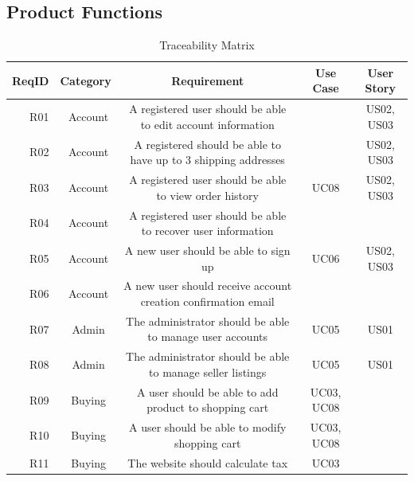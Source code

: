 \documentclass[11pt]{article}
\newcounter{use case ID}
\begin{document}
\subsection{Product Functions}
\begin{table}[H]
        \caption{Traceability Matrix}
        \begin{adjustbox}{width=\columnwidth,center}
            \begin{tabular}{|r | c| c | c| c|}
                \hline
                ReqID & Category & Requirement & Use Case & User Story \\
                \hline
                R01 & \ Account & A \index{registered user}registered user should be able to edit account \index{information}information & & US02, US03 \\
                    \hline
                R02 & \ Account & A registered should be able to have up to 3 shipping addresses &  & US02, US03 \\
                    \hline
                R03 & \ Account & A registered user should be able to view order history & UC08 & US02, US03 \\
                \hline
                R04 & \ Account & A registered user should be able to recover user \index{information}information & &  \\
                \hline
                R05 & \ Account & A new user should be able to sign up & UC06 & US02, US03  \\
                \hline
                R06 & \ Account & A new user should receive account creation confirmation email & &  \\
                \hline
                R07 & \ Admin & The \index{administrator}administrator should be able to manage user accounts & UC05 & US01  \\
                \hline
                R08 & \ Admin & The \index{administrator}administrator should be able to manage \index{seller}seller listings & UC05  & US01 \\
                \hline
                R09 & \ Buying & A user should be able to add \index{product}product to shopping cart & UC03, UC08 &  \\
                \hline
                R10 & \ Buying & A user should be able to modify shopping cart & UC03, UC08 &  \\
                \hline
                R11 & \ Buying & The website should calculate tax & UC03 &  \\
                \hline

\end{tabular}
\end{adjustbox}
\end{table}
\end{document}
